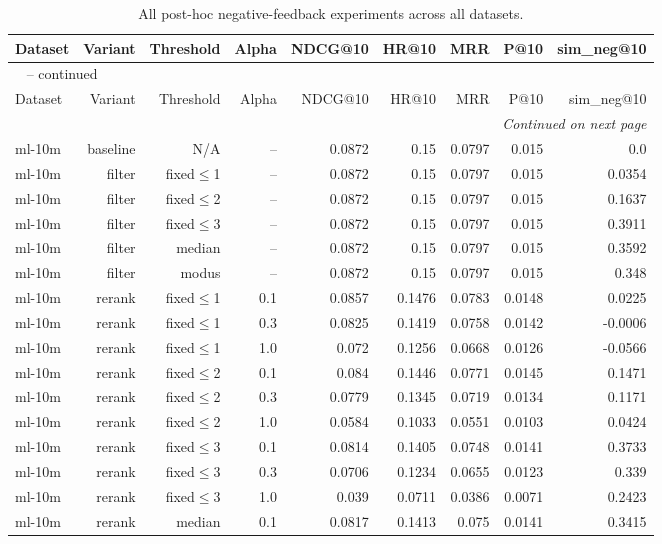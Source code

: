 \begin{longtable}{lrrrrrrrr}
\caption{All post-hoc negative-feedback experiments across all datasets.}\label{tab:all_results}\\
\toprule
Dataset & Variant & Threshold & Alpha & NDCG@10 & HR@10 & MRR & P@10 & sim\_neg@10 \\
\midrule
\endfirsthead
\multicolumn{9}{l}{\tablename\ \thetable{} -- continued}\\
\toprule
Dataset & Variant & Threshold & Alpha & NDCG@10 & HR@10 & MRR & P@10 & sim\_neg@10 \\
\midrule
\endhead
\midrule
\multicolumn{9}{r}{\textit{Continued on next page}}\\
\endfoot
\bottomrule
\endlastfoot
ml-10m & baseline & N/A & -- & 0.0872 & 0.15 & 0.0797 & 0.015 & 0.0 \\
ml-10m & filter & fixed$\leq$1 & -- & 0.0872 & 0.15 & 0.0797 & 0.015 & 0.0354 \\
ml-10m & filter & fixed$\leq$2 & -- & 0.0872 & 0.15 & 0.0797 & 0.015 & 0.1637 \\
ml-10m & filter & fixed$\leq$3 & -- & 0.0872 & 0.15 & 0.0797 & 0.015 & 0.3911 \\
ml-10m & filter & median & -- & 0.0872 & 0.15 & 0.0797 & 0.015 & 0.3592 \\
ml-10m & filter & modus & -- & 0.0872 & 0.15 & 0.0797 & 0.015 & 0.348 \\
ml-10m & rerank & fixed$\leq$1 & 0.1 & 0.0857 & 0.1476 & 0.0783 & 0.0148 & 0.0225 \\
ml-10m & rerank & fixed$\leq$1 & 0.3 & 0.0825 & 0.1419 & 0.0758 & 0.0142 & -0.0006 \\
ml-10m & rerank & fixed$\leq$1 & 1.0 & 0.072 & 0.1256 & 0.0668 & 0.0126 & -0.0566 \\
ml-10m & rerank & fixed$\leq$2 & 0.1 & 0.084 & 0.1446 & 0.0771 & 0.0145 & 0.1471 \\
ml-10m & rerank & fixed$\leq$2 & 0.3 & 0.0779 & 0.1345 & 0.0719 & 0.0134 & 0.1171 \\
ml-10m & rerank & fixed$\leq$2 & 1.0 & 0.0584 & 0.1033 & 0.0551 & 0.0103 & 0.0424 \\
ml-10m & rerank & fixed$\leq$3 & 0.1 & 0.0814 & 0.1405 & 0.0748 & 0.0141 & 0.3733 \\
ml-10m & rerank & fixed$\leq$3 & 0.3 & 0.0706 & 0.1234 & 0.0655 & 0.0123 & 0.339 \\
ml-10m & rerank & fixed$\leq$3 & 1.0 & 0.039 & 0.0711 & 0.0386 & 0.0071 & 0.2423 \\
ml-10m & rerank & median & 0.1 & 0.0817 & 0.1413 & 0.075 & 0.0141 & 0.3415 \\

\end{longtable}
